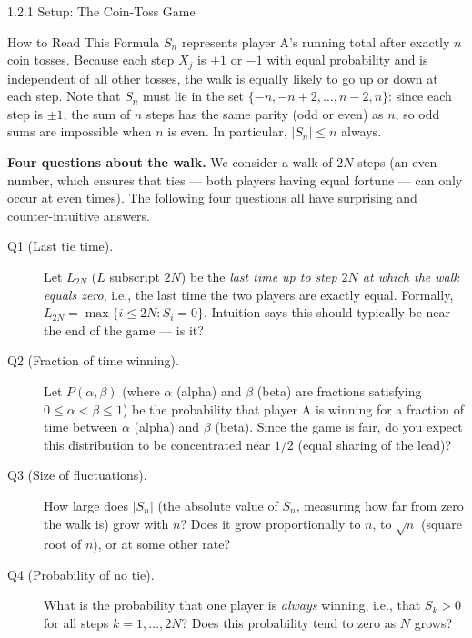 \documentclass[aspectratio=169,10pt]{beamer}
\begin{document}
\begin{frame}[allowframebreaks]{1.2.1 Setup: The Coin-Toss Game}
  \begin{alertblock}{How to Read This Formula}
    $S_n$ represents player A's running total after exactly $n$ coin tosses.
    Because each step $X_j$ is $+1$ or $-1$ with equal probability and is
    independent of all other tosses, the walk is equally likely to go up or
    down at each step.  Note that $S_n$ must lie in the set
    $\{-n, -n+2, \ldots, n-2, n\}$: since each step is $\pm 1$, the sum of
    $n$ steps has the same parity (odd or even) as $n$, so odd sums are
    impossible when $n$ is even.  In particular, $|S_n| \le n$ always.
  \end{alertblock}

  \framebreak

  \textbf{Four questions about the walk.}  We consider a walk of $2N$ steps
  (an even number, which ensures that ties --- both players having equal
  fortune --- can only occur at even times).  The following four questions all
  have surprising and counter-intuitive answers.

  \begin{description}
    \item[Q1 (Last tie time).] Let $L_{2N}$ ($L$ subscript $2N$) be the
      \emph{last time up to step $2N$ at which the walk equals zero},
      i.e., the last time the two players are exactly equal.  Formally,
      $L_{2N} = \max\{i \le 2N : S_i = 0\}$.  Intuition says this should
      typically be near the end of the game --- is it?

    \item[Q2 (Fraction of time winning).] Let $P(\alpha, \beta)$ (where
      $\alpha$ (alpha) and $\beta$ (beta) are fractions satisfying
      $0 \le \alpha < \beta \le 1$) be the probability that player A is
      winning for a fraction of time between $\alpha$ (alpha) and $\beta$ (beta).
      Since the game is fair, do you expect this distribution to be
      concentrated near $1/2$ (equal sharing of the lead)?

    \item[Q3 (Size of fluctuations).] How large does $|S_n|$ (the absolute
      value of $S_n$, measuring how far from zero the walk is) grow with $n$?
      Does it grow proportionally to $n$, to $\sqrt{n}$ (square root of $n$),
      or at some other rate?

    \item[Q4 (Probability of no tie).] What is the probability that one player
      is \emph{always} winning, i.e., that $S_k > 0$ for all steps
      $k = 1, \ldots, 2N$?  Does this probability tend to zero as $N$ grows?
  \end{description}


\end{frame}
\end{document}
